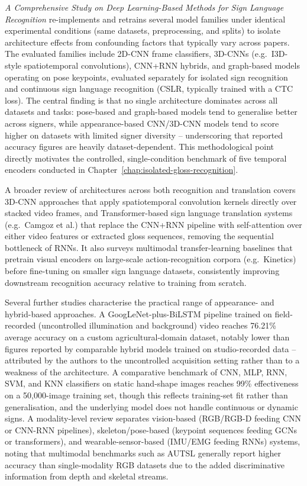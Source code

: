 \emph{A Comprehensive Study on Deep Learning-Based Methods for Sign Language
Recognition} \cite{adaloglou2021comprehensive} re-implements and retrains several
model families under identical experimental conditions (same datasets,
preprocessing, and splits) to isolate architecture effects from confounding
factors that typically vary across papers. The evaluated families include 2D-CNN
frame classifiers, 3D-CNNs (e.g.\ I3D-style spatiotemporal convolutions),
CNN+RNN hybrids, and graph-based models operating on pose keypoints, evaluated
separately for isolated sign recognition and continuous sign language recognition
(CSLR, typically trained with a CTC loss). The central finding is that no single
architecture dominates across all datasets and tasks: pose-based and graph-based
models tend to generalise better across signers, while appearance-based CNN/3D-CNN
models tend to score higher on datasets with limited signer diversity --
underscoring that reported accuracy figures are heavily dataset-dependent. This
methodological point directly motivates the controlled, single-condition
benchmark of five temporal encoders conducted in
Chapter~\ref{chap:isolated-gloss-recognition}.

A broader review of architectures across both recognition and translation
\cite{review2024dlprocessing} covers 3D-CNN approaches that apply spatiotemporal
convolution kernels directly over stacked video frames, and Transformer-based
sign language translation systems (e.g.\ Camgoz et al.) that replace the CNN+RNN
pipeline with self-attention over either video features or extracted gloss
sequences, removing the sequential bottleneck of RNNs. It also surveys
multimodal transfer-learning baselines that pretrain visual encoders on
large-scale action-recognition corpora (e.g.\ Kinetics) before fine-tuning on
smaller sign language datasets, consistently improving downstream recognition
accuracy relative to training from scratch.

Several further studies characterise the practical range of appearance- and
hybrid-based approaches. A GoogLeNet-plus-BiLSTM pipeline trained on
field-recorded (uncontrolled illumination and background) video
\cite{agri2021bilstm} reaches 76.21\% average accuracy on a custom
agricultural-domain dataset, notably lower than figures reported by comparable
hybrid models trained on studio-recorded data -- attributed by the authors to the
uncontrolled acquisition setting rather than to a weakness of the architecture. A
comparative benchmark of CNN, MLP, RNN, SVM, and KNN classifiers on static
hand-shape images \cite{ann2022recognition} reaches 99\% effectiveness on a
50{,}000-image training set, though this reflects training-set fit rather than
generalisation, and the underlying model does not handle continuous or dynamic
signs. A modality-level review \cite{modalities2022review} separates
vision-based (RGB/RGB-D feeding CNN or CNN-RNN pipelines), skeleton/pose-based
(keypoint sequences feeding GCNs or transformers), and wearable-sensor-based
(IMU/EMG feeding RNNs) systems, noting that multimodal benchmarks such as AUTSL
generally report higher accuracy than single-modality RGB datasets due to the
added discriminative information from depth and skeletal streams.


